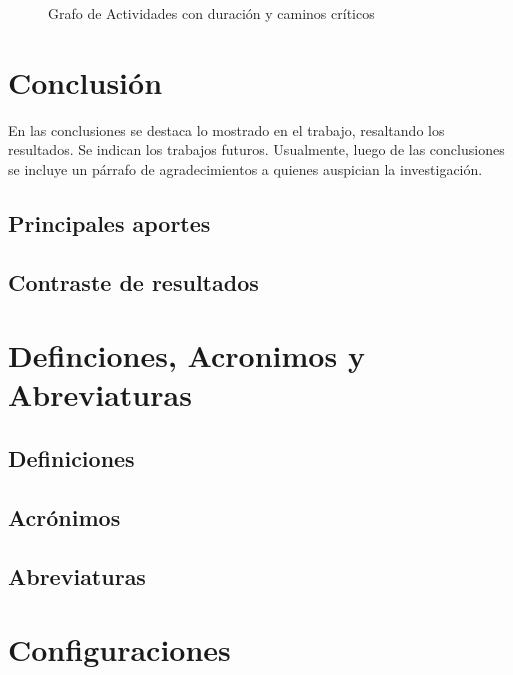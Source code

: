 \documentclass[letter,12pt]{report}
\begin{document}
\begin{landscape}
\begin{figure}[hbt]
  \centering
  \caption{Grafo de Actividades con duración y caminos críticos}
  \label{CPMcritico}
\end{figure}
\end{landscape}

\chapter{Conclusión}\label{conclusion}
En las conclusiones se destaca lo mostrado en el trabajo, resaltando los resultados. Se indican los trabajos futuros. Usualmente, luego de las conclusiones se incluye un párrafo de agradecimientos a quienes auspician la investigación.
\section{Principales aportes}
\section{Contraste de resultados}

\renewcommand{\refname}{Referencias}



\renewcommand{\appendixname}{Anexos}
\appendix

\chapter{Definciones, Acronimos y Abreviaturas}\label{definiciones}
\section{Definiciones}
\section{Acrónimos}
\section{Abreviaturas}

\chapter{Configuraciones}\label{configuracion}
\blindtext %
\end{document}
